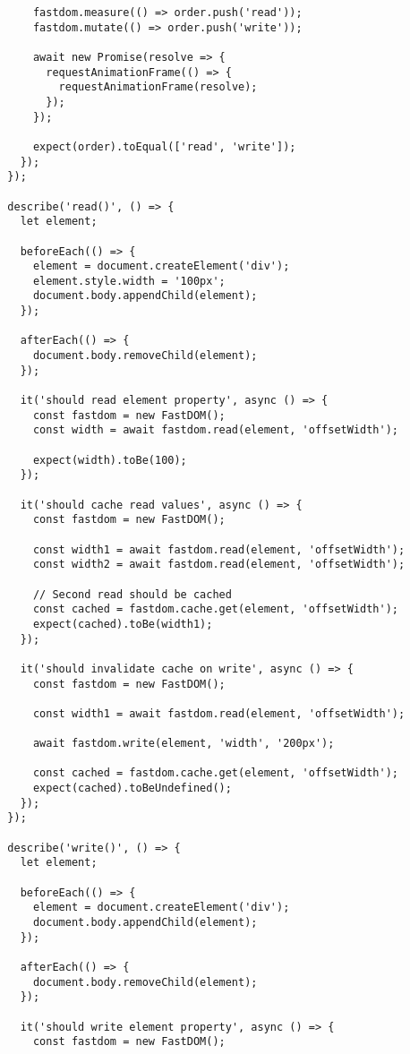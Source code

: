 \documentclass[11pt]{article}
\begin{document}
\begin{verbatim}
      fastdom.measure(() => order.push('read'));
      fastdom.mutate(() => order.push('write'));
      
      await new Promise(resolve => {
        requestAnimationFrame(() => {
          requestAnimationFrame(resolve);
        });
      });
      
      expect(order).toEqual(['read', 'write']);
    });
  });
  
  describe('read()', () => {
    let element;
    
    beforeEach(() => {
      element = document.createElement('div');
      element.style.width = '100px';
      document.body.appendChild(element);
    });
    
    afterEach(() => {
      document.body.removeChild(element);
    });
    
    it('should read element property', async () => {
      const fastdom = new FastDOM();
      const width = await fastdom.read(element, 'offsetWidth');
      
      expect(width).toBe(100);
    });
    
    it('should cache read values', async () => {
      const fastdom = new FastDOM();
      
      const width1 = await fastdom.read(element, 'offsetWidth');
      const width2 = await fastdom.read(element, 'offsetWidth');
      
      // Second read should be cached
      const cached = fastdom.cache.get(element, 'offsetWidth');
      expect(cached).toBe(width1);
    });
    
    it('should invalidate cache on write', async () => {
      const fastdom = new FastDOM();
      
      const width1 = await fastdom.read(element, 'offsetWidth');
      
      await fastdom.write(element, 'width', '200px');
      
      const cached = fastdom.cache.get(element, 'offsetWidth');
      expect(cached).toBeUndefined();
    });
  });
  
  describe('write()', () => {
    let element;
    
    beforeEach(() => {
      element = document.createElement('div');
      document.body.appendChild(element);
    });
    
    afterEach(() => {
      document.body.removeChild(element);
    });
    
    it('should write element property', async () => {
      const fastdom = new FastDOM();
      

\end{verbatim}
\end{document}
